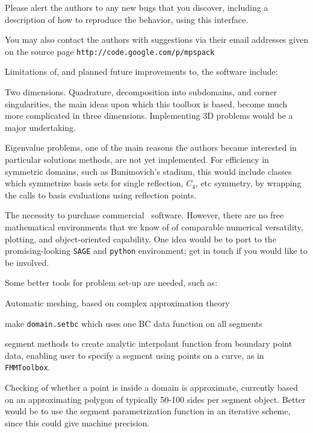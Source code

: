 \documentclass[12pt]{article}
\begin{document}
Please alert the authors to any new
bugs that you discover, including a description
of how to reproduce the behavior, using this interface.

You may also contact the authors with suggestions
via their email addresses
given on the source page {\tt http://code.google.com/p/mpspack}

Limitations of, and planned future improvements to, the software include:

\bi
\item Two dimensions. Quadrature, decomposition into subdomains, and
corner singularities, the
main ideas upon which this toolbox is based, become much more complicated
in three dimensions. 
Implementing 3D problems would be a major undertaking.

\item Eigenvalue problems, one of the main reasons the authors became
interested in particular solutions methods, are not yet implemented.
For efficiency in symmetric domains, such as Bunimovich's stadium,
this would include
classes which symmetrize basis sets for single reflection, $C_4$, etc
symmetry, by wrapping the calls to basis evaluations using reflection
points.

\item The necessity to purchase commercial \matlab\ software.
However, there are no free mathematical environments that we know of
of comparable numerical versatility, plotting, and object-oriented capability.
One idea would be to port to the promising-looking {\tt SAGE} and {\tt python}
environment; get in touch if you would like to be involved.

\item Some better tools for problem set-up are needed, such as:
\bi
  \item Automatic meshing, based on complex approximation theory
  \item make {\tt domain.setbc} which uses one BC data function on all segments
  \item segment methods to create analytic interpolant function from boundary
point data, enabling user to specify a segment using points on a curve,
as in {\tt FMMToolbox}.
\ei

\item Checking of whether a point is inside a domain is approximate,
currently based on an approximating polygon of typically 50-100 sides
per segment object.
Better would be to use the segment parametrization function in
an iterative scheme, since this could give machine precision.
\end{document}
